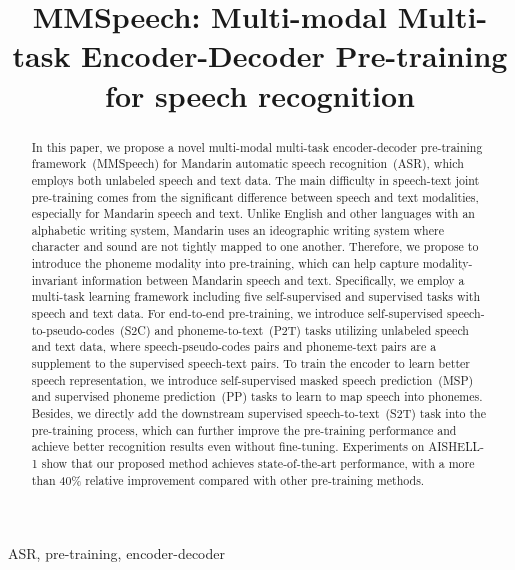 \documentclass{article}
\title{MMSpeech: Multi-modal Multi-task Encoder-Decoder Pre-training for speech recognition}
\begin{document}
\maketitle
\begin{abstract}
In this paper, we propose a novel multi-modal multi-task encoder-decoder pre-training framework~(MMSpeech) for Mandarin automatic speech recognition~(ASR), which employs both unlabeled speech and text data. The main difficulty in speech-text joint pre-training comes from the significant difference between speech and text modalities, especially for Mandarin speech and text. 
Unlike English and other languages with an alphabetic writing system, Mandarin uses an ideographic writing system where character and sound are not tightly mapped to one another.
Therefore, we propose to introduce the phoneme modality into pre-training, which can help capture modality-invariant information between Mandarin speech and text. 
Specifically, we employ a multi-task learning framework including five self-supervised and supervised tasks with speech and text data. 
For end-to-end pre-training, we introduce self-supervised speech-to-pseudo-codes~(S2C) and phoneme-to-text~(P2T) tasks utilizing unlabeled speech and text data, where speech-pseudo-codes pairs and phoneme-text pairs are a supplement to the supervised speech-text pairs. To train the encoder to learn better speech representation, we introduce self-supervised masked speech prediction~(MSP) and supervised phoneme prediction~(PP) tasks to learn to map speech into phonemes. Besides, we directly add the downstream supervised speech-to-text~(S2T) task into the pre-training process, which can further improve the pre-training performance and achieve better recognition results even without fine-tuning.
Experiments on AISHELL-1 show that our proposed method achieves state-of-the-art performance, with a more than 40\% relative improvement compared with other pre-training methods.
\end{abstract}
\begin{keywords}
ASR, pre-training, encoder-decoder
\end{keywords}
\end{document}
